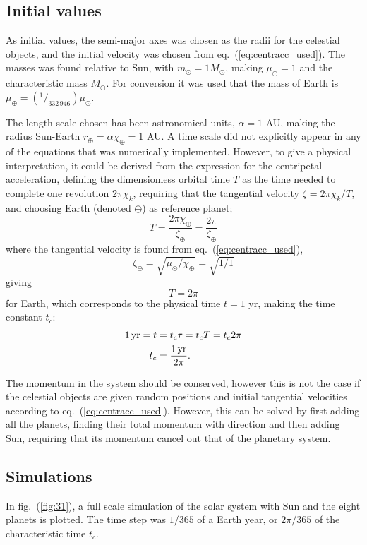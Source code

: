 \documentclass[a4paper,11pt]{article}
\begin{document}
\subsection{Initial values}
As initial values, the semi-major axes was chosen as the radii for the celestial objects, and the initial velocity was chosen from eq.~(\ref{eq:centracc_used}). The masses was found relative to Sun, with $m_\odot = 1 M_\odot$, making $\mu_\odot = 1$ and the characteristic mass $M_\odot$. For conversion it was used that the mass of Earth is $\mu_\oplus = (^1\!/_{332\,946}) \mu_\odot$.

The length scale chosen has been astronomical units, $\alpha = 1$ AU, making the radius Sun-Earth $r_{\oplus} = \alpha \chi_\oplus = 1$ AU. A time scale did not explicitly appear in any of the equations that was numerically implemented. However, to give a physical interpretation, it could be derived from the expression for the centripetal acceleration, defining the dimensionless orbital time $T$ as the time needed to complete one revolution $2 \pi \chi_k$, requiring that the tangential velocity $\zeta = 2\pi \chi_k / T$, and choosing Earth (denoted $\oplus$) as reference planet;
\[ T = \frac{2\pi \chi_\oplus}{\zeta_\oplus} = \frac{2 \pi}{\zeta_\oplus} \]
where the tangential velocity is found from eq.~(\ref{eq:centracc_used}),
\[ \zeta_\oplus = \sqrt{\mu_\odot/\chi_\oplus} = \sqrt{1/1} \]
giving
\[ T = 2\pi \]
for Earth, which corresponds to the physical time $t = 1$ yr, making the time constant $t_c$:
\begin{align}
    1\, {\rm yr} = t &= t_c \tau = t_c T = t_c 2\pi \notag \\
    t_c &= \frac{1\rm\, yr}{2\pi}. 
    \label{eq:time}
\end{align}

The momentum in the system should be conserved, however this is not the case if the celestial objects are given random positions and initial tangential velocities according to eq.~(\ref{eq:centracc_used}). However, this can be solved by first adding all the planets, finding their total momentum with direction and then adding Sun, requiring that its momentum cancel out that of the planetary system.

\subsection{Simulations}
In fig.~(\ref{fig:31}), a full scale simulation of the solar system with Sun and the eight planets is plotted.  The time step was $1/365$ of a Earth year, or $2\pi /365$ of the characteristic time $t_c$. 
\end{document}
